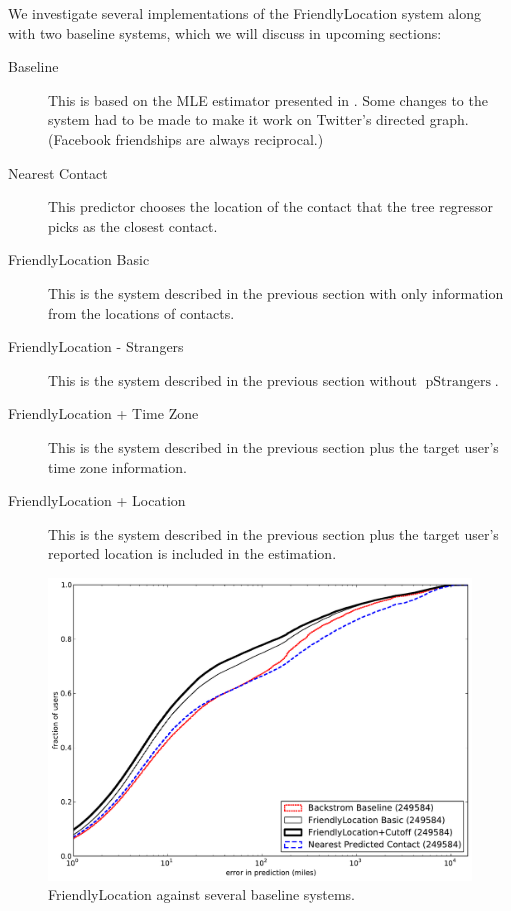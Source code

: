 \documentclass[letterpaper]{article}
\DeclareMathOperator{\pStrangers}{pStrangers}
\begin{document}
We investigate several implementations of the FriendlyLocation system along
with two baseline systems, which we will discuss in upcoming sections:
\begin{description}
\item[Baseline] This is based on the MLE estimator presented in
    \cite{backstrom2010find}. Some changes to the system had to be made to make it
    work on Twitter's directed graph. (Facebook friendships are always
    reciprocal.)
\item[Nearest Contact] This predictor chooses the location of the contact that
    the tree regressor picks as the closest contact.
\item[FriendlyLocation Basic] This is the system described in the previous
    section with only information from the locations of contacts.
\item[FriendlyLocation - Strangers] This is the system described in the previous
    section without $\pStrangers$.
\ifdefined\THESIS
\item[FriendlyLocation + Time Zone] This is the system described in the previous
    section plus the target user's time zone information.
\fi
\item[FriendlyLocation + Location] This is the system described in the previous
    section plus the target user's reported location is included in the
    estimation.
\end{description}

\begin{figure}[tb]
\centering
\includegraphics[width=\linewidth]{figures/fl_basic.pdf}
\caption{
    FriendlyLocation against several baseline systems.
}
\label{fig:results}
\end{figure}
\end{document}
